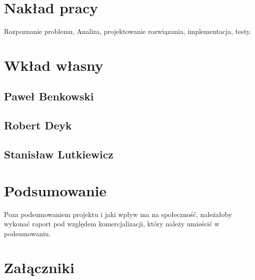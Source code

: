 \documentclass[a4paper,11pt]{report}
\begin{document}
\chapter{Nakład pracy}
Rozpoznanie problemu, Analiza, projektowanie rozwiązania, implementacja, testy.

\chapter {Wkład własny}
\section {Paweł Benkowski}
\section {Robert Deyk}
\section {Stanisław Lutkiewicz}

\chapter {Podsumowanie}
Poza podsumowaniem projektu i jaki wpływ ma na społeczność, należałoby wykonać raport pod względem komercjalizacji, który należy umieścić w podsumowaniu.

 


\chapter {Załączniki}
\end{document}
